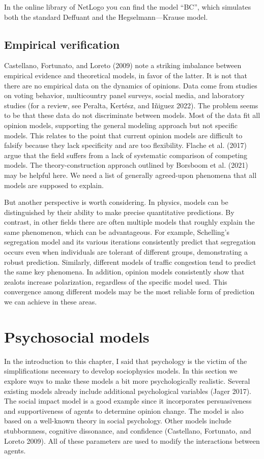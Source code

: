 \documentclass[
  a4paper,
  DIV=11,
  numbers=noendperiod,
  oneside]{scrreprt}
\begin{document}
In the online library of NetLogo you can find the model ``BC'', which
simulates both the standard Deffuant and the Hegselmann---Krause model.

\subsection{Empirical verification}\label{sec-Empirical-verification}

Castellano, Fortunato, and Loreto (2009) note a striking imbalance
between empirical evidence and theoretical models, in favor of the
latter. It is not that there are no empirical data on the dynamics of
opinions. Data come from studies on voting behavior, multicountry panel
surveys, social media, and laboratory studies (for a review, see
Peralta, Kertész, and Iñiguez 2022). The problem seems to be that these
data do not discriminate between models. Most of the data fit all
opinion models, supporting the general modeling approach but not
specific models. This relates to the point that current opinion models
are difficult to falsify because they lack specificity and are too
flexibility. Flache et al. (2017) argue that the field suffers from a
lack of systematic comparison of competing models. The
theory-construction approach outlined by Borsboom et al. (2021) may be
helpful here. We need a list of generally agreed-upon phenomena that all
models are supposed to explain.

But another perspective is worth considering. In physics, models can be
distinguished by their ability to make precise quantitative predictions.
By contrast, in other fields there are often multiple models that
roughly explain the same phenomenon, which can be advantageous. For
example, Schelling's segregation model and its various iterations
consistently predict that segregation occurs even when individuals are
tolerant of different groups, demonstrating a robust prediction.
Similarly, different models of traffic congestion tend to predict the
same key phenomena. In addition, opinion models consistently show that
zealots increase polarization, regardless of the specific model used.
This convergence among different models may be the most reliable form of
prediction we can achieve in these areas.

\section{Psychosocial models}\label{sec-Psychosocial-models}

In the introduction to this chapter, I said that psychology is the
victim of the simplifications necessary to develop sociophysics models.
In this section we explore ways to make these models a bit more
psychologically realistic. Several existing models already include
additional psychological variables (Jager 2017). The social impact model
is a good example since it incorporates persuasiveness and
supportiveness of agents to determine opinion change. The model is also
based on a well-known theory in social psychology. Other models include
stubbornness, cognitive dissonance, and confidence (Castellano,
Fortunato, and Loreto 2009). All of these parameters are used to modify
the interactions between agents.
\end{document}
